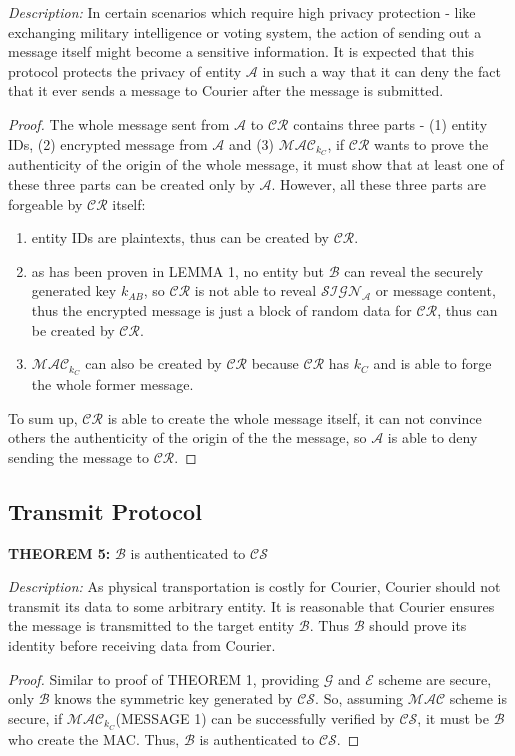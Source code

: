 \bigskip
\noindent
\textit{Description: }In certain scenarios which require high privacy protection - like exchanging military intelligence or voting system, the action of sending out a message itself might become a sensitive information. It is expected that this protocol protects the privacy of entity $ \mathcal{A} $ in such a way that it can deny the fact that it ever sends a message to Courier after the message is submitted.
\bigskip
\begin{proof}
The whole message sent from $\mathcal{A}$ to $\mathcal{CR}$ contains three parts - (1) entity IDs, (2) encrypted message from $\mathcal{A}$ and (3) $\mathcal{MAC}_{k_C}$, if $\mathcal{CR}$ wants to prove the authenticity of the origin of the whole message, it must show that at least one of these three parts can be created only by $\mathcal{A}$. However, all these three parts are forgeable by $\mathcal{CR}$ itself:
\begin{enumerate}
\item entity IDs are plaintexts, thus can be created by $\mathcal{CR}$.
\item as has been proven in LEMMA 1, no entity but $\mathcal{B}$ can reveal the securely generated key $k_{AB}$, so $\mathcal{CR}$ is not able to reveal $\mathcal{SIGN_A}$ or message content, thus the encrypted message is just a block of random data for $\mathcal{CR}$, thus can be created by $\mathcal{CR}$.
\item $\mathcal{MAC}_{k_C}$ can also be created by $\mathcal{CR}$ because $\mathcal{CR}$ has $k_C$ and is able to forge the whole former message.
\end{enumerate}
To sum up, $\mathcal{CR}$ is able to create the whole message itself, it can not convince others the authenticity of the origin of the the message, so $\mathcal{A}$ is able to deny sending the message to $\mathcal{CR}$.
\end{proof}

\vspace{1cm}
\subsection{Transmit Protocol}
\textbf{THEOREM 5:} $\mathcal{B}$ is authenticated to $\mathcal{CS}$

\bigskip
\noindent
\textit{Description: }As physical transportation is costly for Courier, Courier should not transmit its data to some arbitrary entity. It is reasonable that Courier ensures the message is transmitted to the target entity $ \mathcal{B} $. Thus $ \mathcal{B} $
should prove its identity before receiving data from Courier.
\begin{proof}
Similar to proof of THEOREM 1, providing $\mathcal{G}$ and $\mathcal{E}$ scheme are secure, only $\mathcal{B}$ knows the symmetric key generated by $\mathcal{CS}$. So, assuming $\mathcal{MAC}$ scheme is secure, if $\mathcal{MAC}_{k_C}$(MESSAGE 1) can be successfully verified by $\mathcal{CS}$, it must be $\mathcal{B}$ who create the MAC. Thus, $\mathcal{B}$ is authenticated to $\mathcal{CS}$.
\end{proof}

